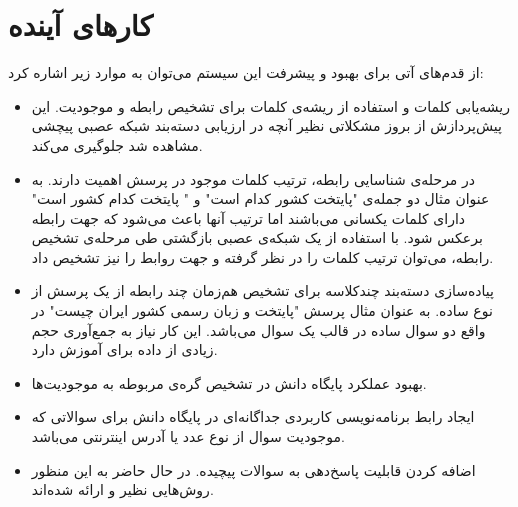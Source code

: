\section{کارهای آینده}
از قدم‌های آتی برای بهبود و پیشرفت این سیستم می‌توان به موارد زیر اشاره کرد: 
\begin{itemize}
	\item ریشه‌یابی کلمات و استفاده از ریشه‌ی کلمات برای تشخیص رابطه و موجودیت. این پیش‌پردازش از بروز مشکلاتی نظیر آنچه در ارزیابی دسته‌بند شبکه عصبی پیچشی مشاهده شد جلوگیری می‌کند.
	\item در مرحله‌ی شناسایی رابطه‌، ترتیب کلمات موجود در پرسش اهمیت دارند. به عنوان مثال دو جمله‌ی "پایتخت کشور  کدام است" و " پایتخت کدام کشور است" دارای کلمات یکسانی می‌باشند اما ترتیب آنها باعث می‌شود که جهت رابطه برعکس شود. با استفاده از یک شبکه‌ی عصبی بازگشتی طی مرحله‌ی تشخیص رابطه، می‌توان ترتیب کلمات را در نظر گرفته و جهت روابط را نیز تشخیص داد.
	\item
	 پیاده‌سازی دسته‌بند چندکلاسه برای تشخیص هم‌زمان چند رابطه از یک پرسش از نوع ساده.  به عنوان مثال پرسش "پایتخت و زبان رسمی کشور ایران چیست" در واقع دو سوال ساده در قالب یک سوال می‌باشد. این کار نیاز به جمع‌آوری حجم زیادی از داده برای آموزش دارد.
	\item بهبود عملکرد پایگاه دانش در تشخیص گره‌ی مربوطه به موجودیت‌ها.
	\item
ایجاد رابط برنامه‌نویسی کاربردی جداگانه‌ای در پایگاه دانش برای سوالاتی که موجودیت سوال از نوع عدد یا آدرس اینترنتی می‌باشد.
	\item
	 اضافه کردن قابلیت پاسخ‌دهی به سوالات پیچیده. در حال حاضر به این منظور روش‌هایی نظیر
	 \cite{zafar2018formalquery} و \cite{unger2012tembased}
	 ارائه شده‌اند.
\end{itemize}